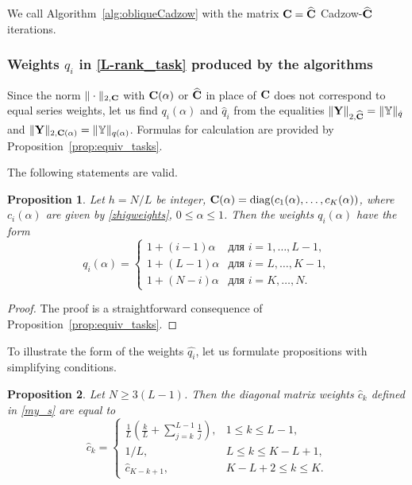 \documentclass[sii]{ipart}
\newtheorem{proposition}{Proposition}
\begin{document}


We call Algorithm~\ref{alg:obliqueCadzow} with the matrix $\mathbf{C}=\widehat{\mathbf{C}}$ Cadzow-$\widehat{\mathbf{C}}$ iterations.

\subsubsection{Weights $q_i$ in \eqref{L-rank_task} produced by the algorithms}
Since the norm $\|\cdot\|_{2, \mathbf{C}}$ with $\mathbf{C}(\alpha)$ or $\widehat{\mathbf{C}}$ in place of $\mathbf{C}$ does not correspond to equal series weights,
let us find $q_i(\alpha)$ and $\hat{q}_i$ from the equalities  
$\|\mathbf{Y}\|_{2,\widehat{\mathbf{C}}}=\|\mathbb{Y}\|_{\hat{q}}$ and $\|\mathbf{Y}\|_{2,\mathbf{C}(\alpha)}=\|\mathbb{Y}\|_{q(\alpha)}$.
Formulas for calculation are provided by Proposition~\ref{prop:equiv_tasks}.

The following statements are valid.

\begin{proposition}\label{prop:zhigconseq}
	Let $h = N/L$ be integer, $\mathbf{C}(\alpha) = \mathop{\mathrm{diag}}(c_1(\alpha), \ldots, c_K(\alpha))$, where $c_i(\alpha)$ are given by \eqref{zhigweights}, $0 \le \alpha \le 1$. Then the weights $q_i(\alpha)$ have the form
	\begin{equation*}
	q_i (\alpha) = \begin{cases}
	1 + (i - 1) \alpha & \text{для $i = 1, \ldots, L-1,$}\\
	1 + (L - 1) \alpha & \text{для $i = L, \ldots, K-1,$}\\
	1 + (N - i) \alpha & \text{для $i = K, \ldots, N.$}
	\end{cases}
	\end{equation*}
\end{proposition}
\begin{proof}
	The proof is a straightforward consequence of Proposition~\ref{prop:equiv_tasks}. 
\end{proof}

To illustrate the form of the weights $\hat{q_i}$, let us formulate propositions with simplifying conditions.
\begin{proposition} \label{myweightstat}
	Let $N \ge 3(L-1)$. Then the diagonal matrix weights $\hat c_k$ defined in \eqref{my_s} are equal to
	\begin{equation*}
	\hat c_k = \begin{cases}
	\frac{1}{L}\left(\frac{k}{L} + \sum_{j=k}^{L-1} \frac{1}{j} \right),& 1 \le k \le L-1, \\
	1/L, & L \le k \le K - L + 1,\\
	\hat c_{K - k + 1}, & K - L + 2 \le k \le K.
 	          \end{cases}
	\end{equation*}
\end{proposition}
\end{document}
